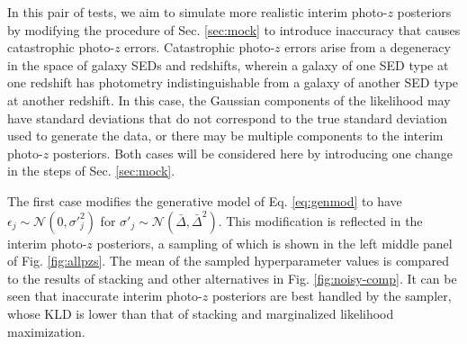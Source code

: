 \documentclass[preprint]{aastex}
\begin{document}
In this pair of tests, we aim to simulate more realistic interim photo-$z$ 
posteriors by modifying the procedure of Sec. \ref{sec:mock} to introduce 
inaccuracy that causes catastrophic photo-$z$ errors.  Catastrophic photo-$z$ 
errors arise from a degeneracy in the space of galaxy SEDs and redshifts, 
wherein a galaxy of one SED type at one redshift has photometry 
indistinguishable from a galaxy of another SED type at another redshift.  In 
this case, the Gaussian components of the likelihood may have standard 
deviations that do not correspond to the true standard deviation used to 
generate the data, or there may be multiple components to the interim photo-$z$ 
posteriors.  Both cases will be considered here by introducing one change in 
the steps of Sec. \ref{sec:mock}.  

The first case modifies the generative model of Eq. \ref{eq:genmod} to have 
$\epsilon_{j}\sim\mathcal{N}(0,\sigma'^{2}_{j})$ for 
$\sigma'_{j}\sim\mathcal{N}(\bar{\Delta},\bar{\Delta}^{2})$.  This modification 
is reflected in the interim photo-$z$ posteriors, a sampling of which is shown 
in the left middle panel of Fig. \ref{fig:allpzs}.  The mean of the sampled 
hyperparameter values is compared to the results of stacking and other 
alternatives in Fig. \ref{fig:noisy-comp}.  It can be seen that inaccurate 
interim photo-$z$ posteriors are best handled by the sampler, whose KLD is 
lower than that of stacking and marginalized likelihood maximization.

\end{document}
